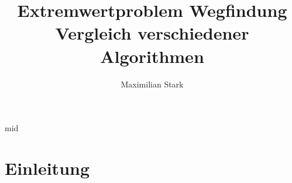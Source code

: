 \documentclass[12pt]{article}
\begin{document}
\renewcommand{\figurename}{Abb.}
\def\figureautorefname{Abb.}
\def\algorithmautorefname{Alg.}


\title{Extremwertproblem Wegfindung \\  \large{\enspace Vergleich verschiedener Algorithmen}}

\author{Maximilian Stark}

\maketitle
\thispagestyle{empty}
\clearpage
mid

\tableofcontents
\thispagestyle{empty}
\clearpage

\section{Einleitung}
\newpage
\end{document}
